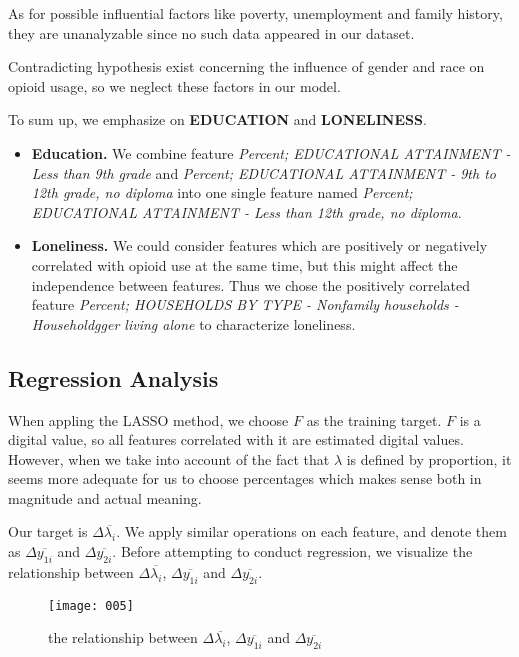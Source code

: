 As for possible influential factors like poverty, unemployment and family history, they are unanalyzable since no such data appeared in our dataset.

Contradicting hypothesis exist concerning the influence of gender and race on opioid usage, so we neglect these factors in our model.

To sum up, we emphasize on \textbf{EDUCATION} and \textbf{LONELINESS}. 

\begin{itemize}
\item \textbf{Education.}
We combine feature \textit{Percent; EDUCATIONAL ATTAINMENT - Less than 9th grade} and \textit{Percent; EDUCATIONAL ATTAINMENT - 9th to 12th grade, no diploma} into one single feature named \textit{Percent; EDUCATIONAL ATTAINMENT - Less than 12th grade, no diploma}.

\item \textbf{Loneliness.}
We could consider features which are positively or negatively correlated with opioid use at the same time, but this might affect the independence between features. Thus we chose the positively correlated feature \textit{Percent; HOUSEHOLDS BY TYPE - Nonfamily households - Householdgger living alone} to characterize loneliness.
\end{itemize}

\subsection{Regression Analysis}


When appling the LASSO method, we choose $F$ as the training target. $F$ is a digital value, so all features correlated with it are estimated digital values. However, when we take into account of the fact that $\lambda$ is defined by proportion, it seems more adequate for us to choose percentages which makes sense both in magnitude and actual meaning.


Our target is $\Delta \overline{\lambda_i}$. We apply similar operations on each feature, and denote them as $\Delta \overline{y_{1i}}$ and  $\Delta \overline{y_{2i}}$. Before attempting to conduct regression, we visualize the relationship between $\Delta \overline{\lambda_i}$, $\Delta \overline{y_{1i}}$ and  $\Delta \overline{y_{2i}}$.
\begin{figure}[H]
	\centering
	\texttt{[image: 005]}
	\caption{the relationship between $\Delta \overline{\lambda_i}$, $\Delta \overline{y_{1i}}$ and  $\Delta \overline{y_{2i}}$}
\end{figure}


